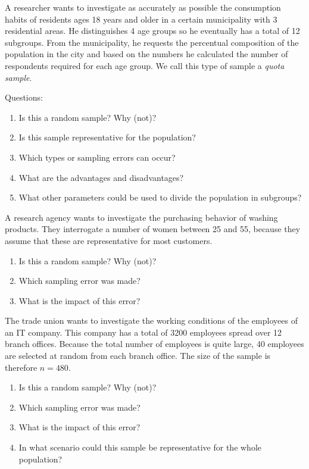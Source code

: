 \begin{exercise}
    A researcher wants to investigate as accurately as possible the consumption habits of residents ages 18 years and older in a certain municipality with 3 residential areas. 
    He distinguishes 4 age groups so he eventually has a total of 12 subgroups. 
    From the municipality, he requests the percentual composition of the population in the city and based on the numbers he calculated the number of respondents required for each age group.
    We call this type of sample a \emph{quota sample}.
    
    Questions:
    \begin{enumerate}[label=\alph*.]
      \item Is this a random sample? Why (not)?
      \item Is this sample representative for the population?
      \item Which types or sampling errors can occur?
      \item What are the advantages and disadvantages?
      \item What other parameters could be used to divide the population in subgroups?
    \end{enumerate}
  \end{exercise}
  
  \begin{exercise}
    A research agency wants to investigate the purchasing behavior of washing products.
    They interrogate a number of women between 25 and 55, because they assume that these are representative for most customers.
    
    \begin{enumerate}[label=\alph*.]
      \item Is this a random sample? Why (not)?
      \item Which sampling error was made?
      \item What is the impact of this error?
    \end{enumerate}
  \end{exercise}
  
  \begin{exercise}

    

    The trade union wants to investigate the working conditions of the employees of an IT company.
    This company has a total of 3200 employees spread over 12 branch offices.
    Because the total number of employees is quite large, 40 employees are selected at random from each branch office.
    The size of the sample is therefore $ n = 480 $.
    
    \begin{enumerate}[label=\alph*.]
      \item Is this a random sample? Why (not)?
      \item Which sampling error was made?
      \item What is the impact of this error?
      \item In what scenario could this sample be representative for the whole population?
    \end{enumerate}
  \end{exercise}
  
